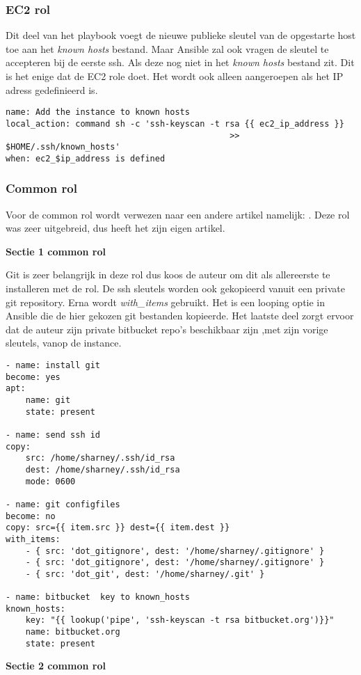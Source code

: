 \subsubsection{EC2 rol}
Dit deel van het playbook voegt de nieuwe publieke sleutel van de opgestarte host toe aan het \textit{known hosts} bestand. Maar Ansible zal ook vragen de sleutel te accepteren bij de eerste ssh. Als deze nog niet in het \textit{known hosts} bestand zit. Dit is het enige dat de EC2 role doet. Het wordt ook alleen aangeroepen als het IP adress gedefinieerd is.
\begin{lstlisting}[basicstyle=\small]
name: Add the instance to known hosts
local_action: command sh -c 'ssh-keyscan -t rsa {{ ec2_ip_address }}
                                             >> $HOME/.ssh/known_hosts'
when: ec2_$ip_address is defined
\end{lstlisting}

\newpage
\subsubsection{Common rol}
Voor de common rol wordt verwezen naar een andere artikel namelijk: \autocite{commonscottharney}. Deze rol was zeer uitgebreid, dus heeft het zijn eigen artikel.


\textbf{Sectie 1 common rol}

Git is zeer belangrijk in deze rol dus koos de auteur om dit als allereerste te installeren met de rol. De ssh sleutels worden ook gekopieerd vanuit een private git repository. Erna wordt \textit{with\_items} gebruikt. Het is een looping optie in Ansible die de hier gekozen git bestanden kopieerde. Het laatste deel zorgt ervoor dat de auteur zijn private bitbucket repo's beschikbaar zijn ,met zijn vorige sleutels, vanop de instance.
\begin{lstlisting}[basicstyle=\small]
- name: install git
become: yes
apt:
    name: git
    state: present

- name: send ssh id
copy:
    src: /home/sharney/.ssh/id_rsa
    dest: /home/sharney/.ssh/id_rsa
    mode: 0600

- name: git configfiles
become: no
copy: src={{ item.src }} dest={{ item.dest }}
with_items:
    - { src: 'dot_gitignore', dest: '/home/sharney/.gitignore' }
    - { src: 'dot_gitignore', dest: '/home/sharney/.gitignore' }
    - { src: 'dot_git', dest: '/home/sharney/.git' }

- name: bitbucket  key to known_hosts
known_hosts:
    key: "{{ lookup('pipe', 'ssh-keyscan -t rsa bitbucket.org')}}"
    name: bitbucket.org
    state: present
\end{lstlisting}
\newpage
\textbf{Sectie 2 common rol}

